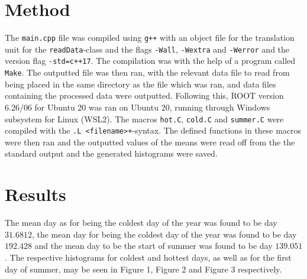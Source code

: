 \documentclass[a4, 12pt]{article}
\begin{document}
\section{Method}
The \texttt{main.cpp} file was compiled using \texttt{g++} with an object file for the translation unit for the \texttt{readData}-class and the flags \texttt{-Wall}, \texttt{-Wextra} and \texttt{-Werror} and the version flag \texttt{-std=c++17}. The compilation was with the help of a program called \texttt{Make}. The outputted file was then ran, with the relevant data file to read from being placed in the same directory as the file which was ran, and data files containing the processed data were outputted. Following this, ROOT version 6.26/06 for Ubuntu 20 was ran on Ubuntu 20, running through Windows subsystem for Linux (WSL2). The macros \texttt{hot.C}, \texttt{cold.C} and \texttt{summer.C} were compiled with the \texttt{.L <filename>+}-syntax. The defined functions in these macros were then ran and the outputted values of the means were read off from the the standard output and the generated histograms were saved.



\section{Results}
The mean day as for being the coldest day of the year was found to be day $31.6812$, the mean day for being the coldest day of the year was found to be day $ 192.428$ and the mean day to be the start of summer was found to be day $139.051$. The respective histograms for coldest and hottest days, as well as for the first day of summer, may be seen in Figure 1, Figure 2 and Figure 3 respectively.


\end{document}
